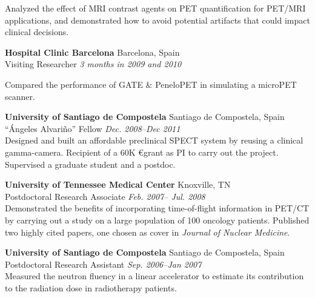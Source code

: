 \documentclass[letterpaper]{article}
\begin{document}
\begin{description}
Analyzed the effect of MRI contrast agents on PET quantification for PET/MRI
applications, and demonstrated how to avoid potential artifacts that could impact clinical decisions.

\item[]
    \textbf{Hospital Clinic Barcelona} \hfill Barcelona, Spain 
\\
Visiting Researcher \hfill  \textit{3 months in 2009 and 2010} 

Compared the performance of GATE \& PeneloPET in simulating a microPET
scanner.

\item[]
    \textbf{University of Santiago de Compostela} \hfill Santiago de
    Compostela, Spain
\\
    ``\'Angeles Alvari\~no'' Fellow \hfill \textit{Dec. 2008--Dec 2011}
\vspace*{0.5ex}
    \\
    Designed and built an affordable preclinical SPECT system by reusing a
    clinical gamma-camera. Recipient of a 60K \euro grant as PI to carry out
    the project. Supervised a graduate student and a postdoc.


\item[]
    \textbf{University of Tennessee Medical Center} \hfill Knoxville, TN
\\
Postdoctoral Research Associate \hfill \textit{Feb. 2007-- Jul. 2008} 
\vspace*{0.5ex}
\\
Demonstrated the benefits of incorporating time-of-flight information in PET/CT
by carrying out a study on a large population of 100 oncology patients. Published
two highly cited papers, one chosen as cover in \textit{Journal of Nuclear Medicine}.

\item[]
    \textbf{University of Santiago de Compostela} \hfill Santiago de
    Compostela, Spain
\\
    Postdoctoral Research Assistant \hfill \textit{Sep. 2006--Jan 2007}
\vspace*{0.5ex}
    \\
    Measured the neutron fluency in a linear accelerator to estimate its
    contribution to the radiation dose in radiotherapy patients.


\end{description}
\end{document}
